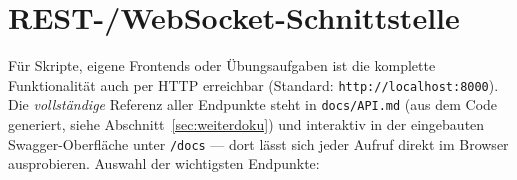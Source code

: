\documentclass[11pt,a4paper,parskip=half]{scrreprt}
\newcommand{\api}[1]{\texttt{#1}}                    %
\begin{document}
\appendix

\chapter{REST-/WebSocket-Schnittstelle}
\label{app:api}

Für Skripte, eigene Frontends oder Übungsaufgaben ist die komplette
Funktionalität auch per HTTP erreichbar (Standard:
\texttt{http://localhost:8000}). Die \emph{vollständige} Referenz
aller Endpunkte steht in \texttt{docs/API.md} (aus dem Code
generiert, siehe Abschnitt~\ref{sec:weiterdoku}) und interaktiv in
der eingebauten Swagger-Oberfläche unter \api{/docs} --- dort lässt
sich jeder Aufruf direkt im Browser ausprobieren. Auswahl der
wichtigsten Endpunkte:
\end{document}
